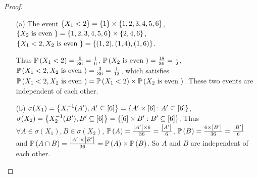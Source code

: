 \begin{proof}
\begin{enumerate}
    \item[(a)]
    The event $\left\{ X_1 < 2 \right\} = \left\{ 1 \right\}\times \left\{ 1,2,3,4,5,6 \right\}$, $\left\{ X_2 \text{ is even } \right\} = \left\{ 1,2,3,4,5,6 \right\} \times \left\{ 2,4,6 \right\}$,\\  $\left\{ X_1 < 2, X_2 \text{ is even } \right\} = \left\{ (1,2),(1,4),(1,6) \right\}$.

    Thus $\mathbb{P} \left(X_1 < 2\right) = \frac{6}{36} = \frac{1}{6}$, $\mathbb{P} \left(X_2 \text{ is even }\right) = \frac{18}{36} = \frac{1}{2}$, $\mathbb{P} \left(X_1 < 2, X_2 \text{ is even }\right) = \frac{3}{36} = \frac{1}{12}$, which satisfies $\mathbb{P} \left(X_1 < 2, X_2 \text{ is even }\right) = \mathbb{P} \left(X_1 < 2\right)\times \mathbb{P} \left(X_2 \text{ is even }\right)$. These two events are independent of each other.

\item[(b)] $\sigma(X_1) = \left\{ X_1^{-1}(A'),A'\subseteq [6] \right\} = \left\{ A'\times [6]:A' \subseteq [6] \right\}$,  $\sigma(X_2) = \left\{ X_2^{-1}(B'),B'\subseteq [6] \right\} = \left\{ [6]\times B':B' \subseteq [6] \right\}$. Thus $\forall A \in \sigma(X_1), B \in \sigma(X_2)$, $\mathbb{P} \left(A\right) = \frac{\left| A' \right|\times 6}{36} = \frac{\left| A' \right|}{6}$, $\mathbb{P} \left(B\right) = \frac{6\times \left| B' \right|}{36} = \frac{\left| B' \right|}{6}$ and $\mathbb{P} \left(A \cap B\right) = \frac{\left| A' \right|\times \left| B' \right|}{36} =\mathbb{P} \left(A\right) \times \mathbb{P} \left(B\right)$. So $A$ and $B$ are independent of each other.
\end{enumerate}
\end{proof}

